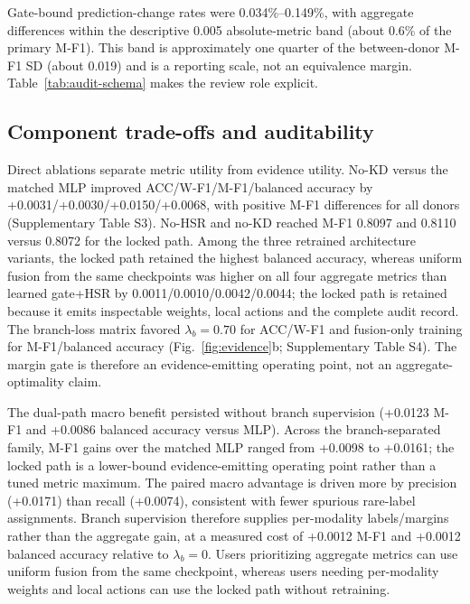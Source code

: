 \documentclass[unnumsec,webpdf,contemporary,large,numbered]{oup-authoring-template}
\begin{document}
\begin{table}[b]
\centering
\caption{Audit-record schema and three checksum-linked case records: branch agreement, binary branch conflict and a sparse HSR correct-to-wrong change. They support structured review without guaranteeing correctness.}
\label{tab:audit-schema}
\footnotesize
\setlength{\tabcolsep}{2pt}
\renewcommand{\arraystretch}{1.08}

\end{table}

Gate-bound prediction-change rates were 0.034\%--0.149\%, with aggregate differences within the descriptive 0.005 absolute-metric band (about 0.6\% of the primary M-F1). This band is approximately one quarter of the between-donor M-F1 SD (about 0.019) and is a reporting scale, not an equivalence margin. Table~\ref{tab:audit-schema} makes the review role explicit.

\subsection{Component trade-offs and auditability}

Direct ablations separate metric utility from evidence utility. No-KD versus the matched MLP improved ACC/W-F1/M-F1/balanced accuracy by +0.0031/+0.0030/+0.0150/+0.0068, with positive M-F1 differences for all donors (Supplementary Table S3). No-HSR and no-KD reached M-F1 0.8097 and 0.8110 versus 0.8072 for the locked path. Among the three retrained architecture variants, the locked path retained the highest balanced accuracy, whereas uniform fusion from the same checkpoints was higher on all four aggregate metrics than learned gate+HSR by 0.0011/0.0010/0.0042/0.0044; the locked path is retained because it emits inspectable weights, local actions and the complete audit record. The branch-loss matrix favored $\lambda_b=0.70$ for ACC/W-F1 and fusion-only training for M-F1/balanced accuracy (Fig.~\ref{fig:evidence}b; Supplementary Table S4). The margin gate is therefore an evidence-emitting operating point, not an aggregate-optimality claim.

The dual-path macro benefit persisted without branch supervision (+0.0123 M-F1 and +0.0086 balanced accuracy versus MLP). Across the branch-separated family, M-F1 gains over the matched MLP ranged from +0.0098 to +0.0161; the locked path is a lower-bound evidence-emitting operating point rather than a tuned metric maximum. The paired macro advantage is driven more by precision (+0.0171) than recall (+0.0074), consistent with fewer spurious rare-label assignments. Branch supervision therefore supplies per-modality labels/margins rather than the aggregate gain, at a measured cost of +0.0012 M-F1 and +0.0012 balanced accuracy relative to $\lambda_b=0$. Users prioritizing aggregate metrics can use uniform fusion from the same checkpoint, whereas users needing per-modality weights and local actions can use the locked path without retraining.
\end{document}

